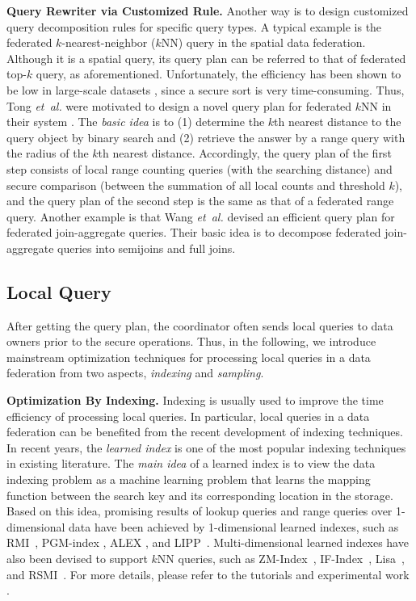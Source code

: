 \documentclass[11pt]{article}
\newcommand{\etal}{\textit{et~al.}\xspace}
\newcommand{\fakeparagraph}[1]{\vspace{1mm}\noindent\textbf{#1.}}
\begin{document}
\fakeparagraph{Query Rewriter via Customized Rule}
Another way is to design customized query decomposition rules for specific query types.
A typical example is the federated $k$-nearest-neighbor ($k$NN) query \cite{ref_tong2022hu} in the spatial data federation. 
Although it is a spatial query, its query plan can be referred to that of federated top-$k$ query, as aforementioned.
Unfortunately, the efficiency has been shown to be low in large-scale datasets \cite{ref_tong2022hu}, since a secure sort is very time-consuming.
Thus, Tong \etal \cite{ref_tong2022hu} were motivated to design a novel query plan for federated $k$NN in their system \HuFu.
The \textit{basic idea} is to (1) determine the $k$th nearest distance to the query object by binary search and (2) retrieve the answer by a range query with the radius of the $k$th nearest distance.
Accordingly, the query plan of the first step consists of local range counting queries (with the searching distance) and secure comparison (between the summation of all local counts and threshold $k$),
and the query plan of the second step is the same as that of a federated range query.
Another example is that Wang \etal \cite{ref_wang2021secure} devised an efficient query plan for federated join-aggregate queries.
Their basic idea is to decompose federated join-aggregate queries into semijoins and full joins.

\subsection{Local Query}\label{sec:data-local}

After getting the query plan, the coordinator often sends local queries to data owners prior to the secure operations.
Thus, in the following, we introduce mainstream optimization techniques for processing local queries in a data federation from two aspects, \textit{indexing} and \textit{sampling}.

\fakeparagraph{Optimization By Indexing}
Indexing is usually used to improve the time efficiency of processing local queries.
In particular, local queries in a data federation can be benefited from the recent development of indexing techniques.
In recent years, the \textit{learned index} is one of the most popular indexing techniques in existing literature.
The \textit{main idea} of a learned index is to view the data indexing problem as a machine learning problem that learns the mapping function between the search key and its corresponding location in the storage.
Based on this idea, promising results of lookup queries and range queries over 1-dimensional data have been achieved by 1-dimensional learned indexes, such as RMI~\cite{DBLP:conf/sigmod/KraskaBCDP18}, PGM-index \cite{DBLP:journals/pvldb/FerraginaV20}, ALEX \cite{DBLP:conf/sigmod/DingMYWDLZCGKLK20}, and LIPP~\cite{DBLP:journals/pvldb/WuZCCWX21}.
Multi-dimensional learned indexes have also been devised to support $k$NN queries, such as ZM-Index~\cite{DBLP:conf/mdm/WangFX019}, IF-Index~\cite{DBLP:conf/vldb/0001KH20}, Lisa~\cite{DBLP:conf/sigmod/Li0ZY020}, and RSMI~\cite{DBLP:journals/pvldb/QiLJK20}.
For more details, please refer to the tutorials \cite{DBLP:conf/sigmod/IdreosK19} and experimental work \cite{DBLP:journals/pvldb/MarcusKRSMK0K20}.
\end{document}
